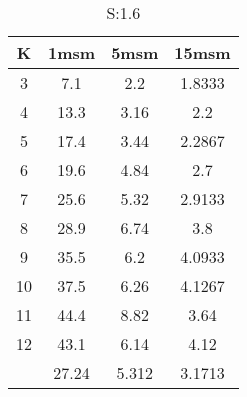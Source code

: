 \begin{table}[H]
\centering
\begin{tabular}{c|ccc}
K &1msm &5msm &15msm\\
\hline
3 & 7.1 & 2.2 & 1.8333\\
4 & 13.3 & 3.16 & 2.2\\
5 & 17.4 & 3.44 & 2.2867\\
6 & 19.6 & 4.84 & 2.7\\
7 & 25.6 & 5.32 & 2.9133\\
8 & 28.9 & 6.74 & 3.8\\
9 & 35.5 & 6.2 & 4.0933\\
10 & 37.5 & 6.26 & 4.1267\\
11 & 44.4 & 8.82 & 3.64\\
12 & 43.1 & 6.14 & 4.12\\
\hline
& 27.24 & 5.312 & 3.1713\\
\end{tabular}
\caption{S:1.6}
\label{tab:s1.6}
\end{table}
